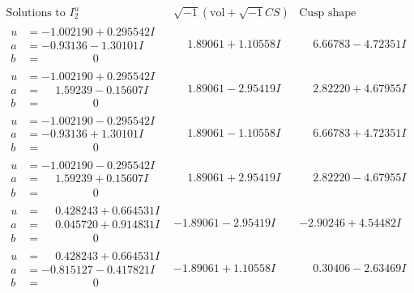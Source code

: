 \documentclass[1p]{elsarticle_modified}
\theoremstyle{definition}
\newcommand{\I}{\sqrt{-1}}
\begin{document}
$$\begin{array}{c|c|c}  
\text{Solutions to }I^u_{2}& \I (\text{vol} + \sqrt{-1}CS) & \text{Cusp shape}\\
 \hline 
\begin{aligned}
u &= -1.002190 + 0.295542 I \\
a &= -0.93136 - 1.30101 I \\
b &= \phantom{-0.000000 } 0\end{aligned}
 & \phantom{-}1.89061 + 1.10558 I & \phantom{-}6.66783 - 4.72351 I \\ \hline\begin{aligned}
u &= -1.002190 + 0.295542 I \\
a &= \phantom{-}1.59239 - 0.15607 I \\
b &= \phantom{-0.000000 } 0\end{aligned}
 & \phantom{-}1.89061 - 2.95419 I & \phantom{-}2.82220 + 4.67955 I \\ \hline\begin{aligned}
u &= -1.002190 - 0.295542 I \\
a &= -0.93136 + 1.30101 I \\
b &= \phantom{-0.000000 } 0\end{aligned}
 & \phantom{-}1.89061 - 1.10558 I & \phantom{-}6.66783 + 4.72351 I \\ \hline\begin{aligned}
u &= -1.002190 - 0.295542 I \\
a &= \phantom{-}1.59239 + 0.15607 I \\
b &= \phantom{-0.000000 } 0\end{aligned}
 & \phantom{-}1.89061 + 2.95419 I & \phantom{-}2.82220 - 4.67955 I \\ \hline\begin{aligned}
u &= \phantom{-}0.428243 + 0.664531 I \\
a &= \phantom{-}0.045720 + 0.914831 I \\
b &= \phantom{-0.000000 } 0\end{aligned}
 & -1.89061 - 2.95419 I & -2.90246 + 4.54482 I \\ \hline\begin{aligned}
u &= \phantom{-}0.428243 + 0.664531 I \\
a &= -0.815127 - 0.417821 I \\
b &= \phantom{-0.000000 } 0\end{aligned}
 & -1.89061 + 1.10558 I & \phantom{-}0.30406 - 2.63469 I \\ \hline\begin{aligned}

\end{aligned}
\end{array}$$
\end{document}
